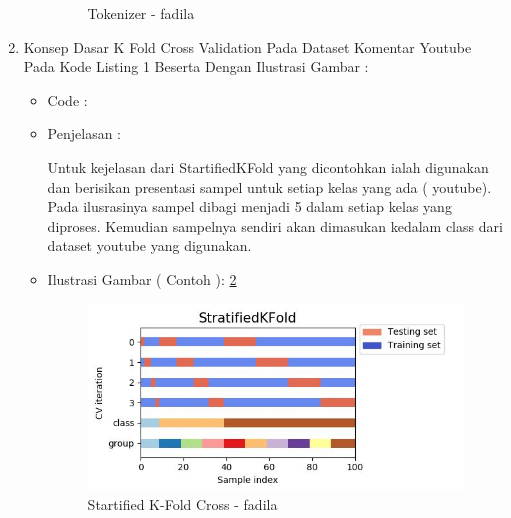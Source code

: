 \begin{enumerate}
\begin{itemize}
\begin{figure}[!hbtp]
\caption{Tokenizer - fadila}
\label{chapter-7-tokenizer-fadila}
\end{figure}
\par
\end{itemize}
\par
\par
\item Konsep Dasar K Fold Cross Validation Pada Dataset Komentar Youtube Pada Kode Listing 1 Beserta Dengan Ilustrasi Gambar :
\begin{itemize}
\item Code		:

\item Penjelasan	: 
\par Untuk kejelasan dari StartifiedKFold yang dicontohkan ialah digunakan dan berisikan presentasi sampel untuk setiap kelas yang ada ( youtube). Pada ilusrasinya sampel dibagi menjadi 5 dalam setiap kelas yang diproses. Kemudian sampelnya sendiri akan dimasukan kedalam class dari dataset youtube yang digunakan.
\par
\item Ilustrasi Gambar ( Contoh ): \ref{chapter-7-starfied-k-fold-cross-fadila}
\par
\par
\begin{figure}[!hbtp]
\centering
\includegraphics[scale=0.2]{figures/chapter-7-starfied-k-fold-cross-fadila.jpg}
\caption{Startified K-Fold Cross - fadila}
\label{chapter-7-starfied-k-fold-cross-fadila}
\end{figure}
\par
\par
\end{itemize}
\par
\par
\par

\end{enumerate}
